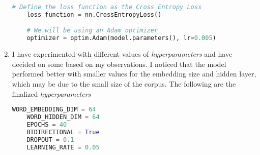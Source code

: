 \begin{enumerate}
	\begin{lstlisting}[language=Python]
	# Define the loss function as the Cross Entropy Loss
	loss_function = nn.CrossEntropyLoss()

	# We will be using an Adam optimizer
	optimizer = optim.Adam(model.parameters(), lr=0.005)
	\end{lstlisting}
	
	\item I have experimented with different values of \textit{hyperparameters} and have decided on some based on my observations. I noticed that the model performed better with smaller values for the embedding size and hidden layer, which may be due to the small size of the corpus. The following are the finalized \textit{hyperparameters}
	\begin{lstlisting}[language=Python]
	WORD_EMBEDDING_DIM = 64
	WORD_HIDDEN_DIM = 64
	EPOCHS = 40
	BIDIRECTIONAL = True
	DROPOUT = 0.1
	LEARNING_RATE = 0.05
	\end{lstlisting}
	
	
	
	
	
	
	
\end{enumerate}